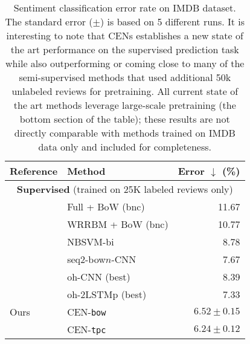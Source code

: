 \documentclass[twoside,11pt]{article}
\begin{document}
\begin{table}[t]
\renewcommand{\arraystretch}{1.1}
\centering
\caption{Sentiment classification error rate on IMDB dataset.
The standard error ($\pm$) is based on 5 different runs.
It is interesting to note that CENs establishes a new state of the art performance on the supervised prediction task while also outperforming or coming close to many of the semi-supervised methods that used additional 50k unlabeled reviews for pretraining.
All current state of the art methods leverage large-scale pretraining (the bottom section of the table); these results are not directly comparable with methods trained on IMDB data only and included for completeness.}
\label{tab:performance-imdb}
\small
\begin{tabular}{@{}llr@{}}
    \toprule
    \textbf{Reference}                              & \textbf{Method}                           & \textbf{Error $\downarrow$ (\%)}      \\
    \midrule
    \multicolumn{3}{c}{\textbf{Supervised} (trained on 25K labeled reviews only)}                                                       \\
    \midrule
    \citet{Maas:2011:LWV:2002472.2002491}           & Full + BoW (bnc)                          & 11.67                                 \\
    \citet{Dahl:2012:TRB:3042573.3042723}           & WRRBM + BoW (bnc)                         & 10.77                                 \\
    \citet{Wang:2012:BBS:2390665.2390688}           & NBSVM-bi                                  &  8.78                                 \\
    \citet{johnson2014effective}                    & seq2-bow$n$-CNN                           &  7.67                                 \\
    \citet{johnson2015semi}                         & oh-CNN (best)                             &  8.39                                 \\
    \citet{johnson2016supervised}                   & oh-2LSTMp (best)                          &  7.33                                 \\
    \midrule
    Ours                                            & CEN-\texttt{bow}                          & $6.52 \pm 0.15$                       \\
                                                    & CEN-\texttt{tpc}                          & $\boldsymbol{6.24} \pm 0.12$          \\

\end{tabular}
\end{table}
\end{document}
